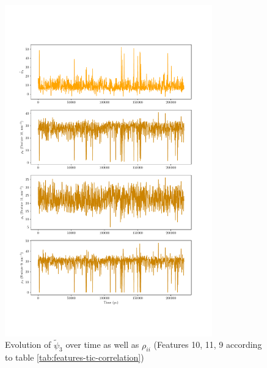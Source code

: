 \begin{spacing}{2.0}
    \begin{figure}[h]
        \centering
        \includegraphics[width=0.8\textwidth]{./figs/fig3-03}
        \caption{Evolution of $\tilde{\psi}_3$ over time as well as $\rho_{ii}$ (Features 10, 11, 9 according to table \ref{tab:features-tic-correlation})}
        \label{fig:time-correlation-psi3}
    \end{figure}


\end{spacing}
